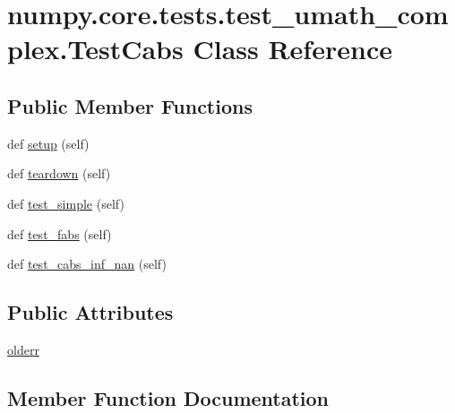 \hypertarget{classnumpy_1_1core_1_1tests_1_1test__umath__complex_1_1TestCabs}{}\section{numpy.\+core.\+tests.\+test\+\_\+umath\+\_\+complex.\+Test\+Cabs Class Reference}
\label{classnumpy_1_1core_1_1tests_1_1test__umath__complex_1_1TestCabs}
\subsection*{Public Member Functions}
\begin{DoxyCompactItemize}
\item 
def \hyperlink{classnumpy_1_1core_1_1tests_1_1test__umath__complex_1_1TestCabs_a2e7b6ee03c603e96f6f60c09c858847f}{setup} (self)
\item 
def \hyperlink{classnumpy_1_1core_1_1tests_1_1test__umath__complex_1_1TestCabs_a1335e9675472ef067931b70eaa609467}{teardown} (self)
\item 
def \hyperlink{classnumpy_1_1core_1_1tests_1_1test__umath__complex_1_1TestCabs_aff5d77c65ec16941f4070a8e28d5ecf3}{test\+\_\+simple} (self)
\item 
def \hyperlink{classnumpy_1_1core_1_1tests_1_1test__umath__complex_1_1TestCabs_a3708781d3cc7d1981b58c3194d3bd8ac}{test\+\_\+fabs} (self)
\item 
def \hyperlink{classnumpy_1_1core_1_1tests_1_1test__umath__complex_1_1TestCabs_a6aa1363de87a59c92b2beff367bfc5cc}{test\+\_\+cabs\+\_\+inf\+\_\+nan} (self)
\end{DoxyCompactItemize}
\subsection*{Public Attributes}
\begin{DoxyCompactItemize}
\item 
\hyperlink{classnumpy_1_1core_1_1tests_1_1test__umath__complex_1_1TestCabs_ab622f84f024ecba74236e23a3061c139}{olderr}
\end{DoxyCompactItemize}


\subsection{Member Function Documentation}
\mbox{\label{classnumpy_1_1core_1_1tests_1_1test__umath__complex_1_1TestCabs_a2e7b6ee03c603e96f6f60c09c858847f}} 
